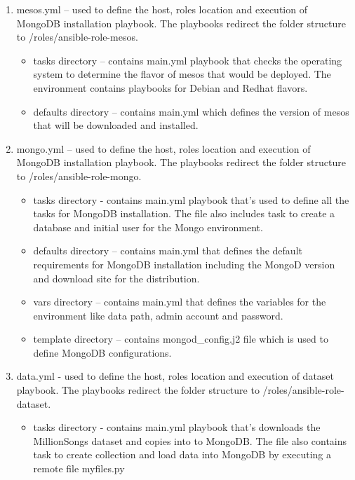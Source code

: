 \documentclass[9pt,twocolumn,twoside]{../../styles/osajnl}
\begin{document}
\begin{enumerate}
    \item mesos.yml – used to define the host, roles location and
      execution of MongoDB installation playbook. The playbooks
      redirect the folder structure to /roles/ansible-role-mesos.
       \begin{itemize}
      \item tasks directory – contains main.yml playbook that checks
        the operating system to determine the flavor of mesos that
        would be deployed. The environment contains playbooks for
        Debian and Redhat flavors.
      \item defaults directory – contains main.yml which defines the
        version of mesos that will be downloaded and installed. 
       \end{itemize}
    \item mongo.yml – used to define the host, roles location and
      execution of MongoDB installation playbook. The playbooks
      redirect the folder structure to /roles/ansible-role-mongo.
      \begin{itemize}
      \item tasks directory - contains main.yml playbook that’s used
        to define all the tasks for MongoDB installation. The file
        also includes task to create a database and initial user for
        the Mongo environment.
      \item defaults directory – contains main.yml that defines the
        default requirements for MongoDB installation including the
        MongoD version and download site for the distribution.
      \item vars directory – contains main.yml that defines the
        variables for the environment like data path, admin account
        and password.
      \item template directory – contains mongod\_config.j2 file which
        is used to define MongoDB configurations.
      \end{itemize}

      \item data.yml - used to define the host, roles location and
        execution of dataset playbook. The playbooks redirect the
        folder structure to /roles/ansible-role-dataset.
        \begin{itemize}
        \item tasks directory - contains main.yml playbook that’s
          downloads the MillionSongs dataset and copies into to
          MongoDB. The file also contains task to create collection
          and load data into MongoDB by executing a remote file
          myfiles.py
        \end{itemize}


\end{enumerate}
\end{document}
